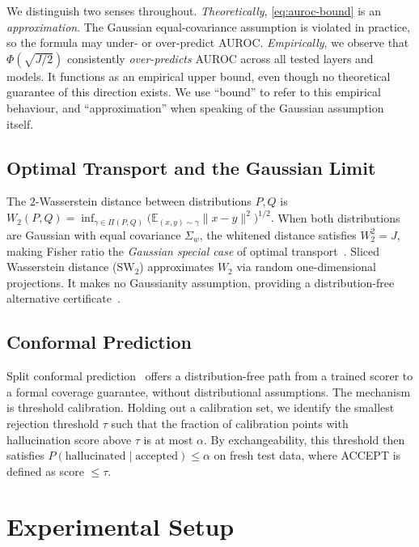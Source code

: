 \documentclass[onecolumn]{jmlr}
\begin{document}
We distinguish two senses throughout.
\textit{Theoretically}, \eqref{eq:auroc-bound} is an \emph{approximation}.
The Gaussian equal-covariance assumption is violated in practice, so the
formula may under- or over-predict AUROC. \textit{Empirically}, we
observe that $\Phi(\sqrt{J/2})$ consistently \emph{over-predicts} AUROC
across all tested layers and models. It functions as an empirical upper
bound, even though no theoretical guarantee of this direction exists. We
use ``bound'' to refer to this empirical behaviour, and
``approximation'' when speaking of the Gaussian assumption itself.

\subsection{Optimal Transport and the Gaussian Limit}
\label{sec:background-ot}

The $2$-Wasserstein distance between distributions $P, Q$ is
$W_2(P, Q) = \inf_{\gamma \in \Pi(P,Q)} \bigl(\mathbb{E}_{(x,y)\sim\gamma}
\|x-y\|^2\bigr)^{1/2}.$
When both distributions are Gaussian with equal covariance $\Sigma_w$,
the whitened distance satisfies $W_2^2 = J$, making Fisher ratio the
\emph{Gaussian special case} of optimal transport~\citep{sugiyama2007}.
Sliced Wasserstein distance ($\text{SW}_2$) approximates $W_2$ via random
one-dimensional projections. It makes no Gaussianity assumption,
providing a distribution-free alternative certificate~\citep{kolouri2019}.

\subsection{Conformal Prediction}
\label{sec:background-conformal}

Split conformal prediction~\citep{angelopoulos2022} offers a
distribution-free path from a trained scorer to a formal coverage
guarantee, without distributional assumptions. The mechanism is
threshold calibration. Holding out a calibration set, we identify the
smallest rejection threshold $\tau$ such that the fraction of
calibration points with hallucination score above $\tau$ is at most
$\alpha$. By exchangeability, this threshold then satisfies
$P(\text{hallucinated} \mid \text{accepted}) \leq \alpha$ on fresh test
data, where ACCEPT is defined as score $\leq \tau$.

\FloatBarrier
\section{Experimental Setup}
\label{sec:setup}
\end{document}
